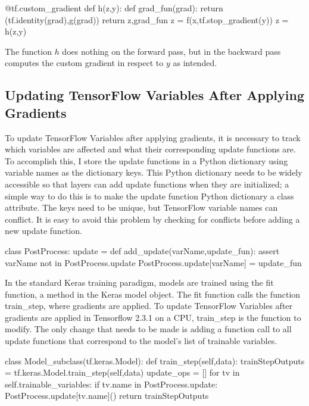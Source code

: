 \begin{code}
@tf.custom_gradient
def h(z,y):
    def grad_fun(grad):
        return (tf.identity(grad),g(grad))
    return z,grad_fun
z = f(x,tf.stop_gradient(y))
z = h(z,y)
\end{code}

The function $h$ does nothing on the forward pass, but in the backward pass computes the custom gradient in respect to $y$ as intended.

\subsection{Updating TensorFlow Variables After Applying Gradients}
To update TensorFlow Variables after applying gradients, it is necessary to track which variables are affected and what their corresponding update functions are. To accomplish this, I store the update functions in a Python dictionary using variable names as the dictionary keys. This Python dictionary needs to be widely accessible so that layers can add update functions when they are initialized; a simple way to do this is to make the update function Python dictionary a class attribute. The keys need to be unique, but TensorFlow variable names can conflict. It is easy to avoid this problem by checking for conflicts before adding a new update function.

\begin{code}
class PostProcess:
    update = {}
    def add_update(varName,update_fun):
        assert varName not in PostProcess.update
        PostProcess.update[varName] = update_fun
\end{code}


In the standard Keras training paradigm, models are trained using the fit function, a method in the Keras model object. The fit function calls the function train\_step, where gradients are applied.  To update TensorFlow Variables after gradients are applied in Tensorflow 2.3.1 on a CPU, train\_step is the function to modify. The only change that needs to be made is adding a function call to all update functions that correspond to the model's list of trainable variables.

\begin{code}
class Model_subclass(tf.keras.Model):
    def train_step(self,data):
        trainStepOutputs = tf.keras.Model.train_step(self,data)
        update_ops = []
        for tv in self.trainable_variables:
            if tv.name in PostProcess.update:
                PostProcess.update[tv.name]()
        return trainStepOutputs
\end{code}

